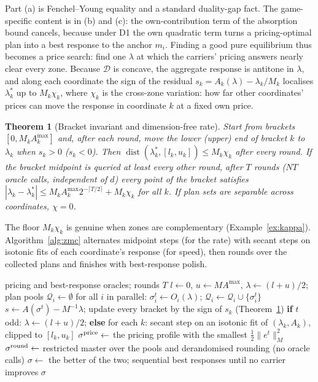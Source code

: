 \documentclass[preprint,12pt]{elsarticle}
\newtheorem{theorem}{Theorem}
\theoremstyle{definition}
\theoremstyle{remark}
\newcommand{\Amax}{A^{\max}}
\begin{document}
Part (a) is Fenchel--Young equality and a standard duality-gap fact. The game-specific content is in (b) and (c): the own-contribution term of the absorption bound cancels, because under D1 the own quadratic term turns a pricing-optimal plan into a best response to the anchor $m_i$. Finding a good pure equilibrium thus becomes a price search: find one $\lambda$ at which the carriers' pricing answers nearly clear every zone. Because $\mathcal D$ is concave, the aggregate response is antitone in $\lambda$, and along each coordinate the sign of the residual $s_k=A_k(\lambda)-\lambda_k/M_k$ localises $\lambda^*_k$ up to $M_k\chi_k$, where $\chi_k$ is the cross-zone variation: how far other coordinates' prices can move the response in coordinate $k$ at a fixed own price.

\begin{theorem}[Bracket invariant and dimension-free rate]\label{thm:bracket}
Start from brackets $[0,M_k\Amax_k]$ and, after each round, move the lower (upper) end of bracket $k$ to $\lambda_k$ when $s_k>0$ ($s_k<0$). Then $\operatorname{dist}(\lambda^*_k,[l_k,u_k])\le M_k\chi_k$ after every round. If the bracket midpoint is queried at least every other round, after $T$ rounds ($NT$ oracle calls, independent of $d$) every point of the bracket satisfies $|\lambda_k-\lambda^*_k|\le M_k\Amax_k2^{-\lceil T/2\rceil}+M_k\chi_k$ for all $k$. If plan sets are separable across coordinates, $\chi=0$.
\end{theorem}

The floor $M_k\chi_k$ is genuine when zones are complementary (Example~\ref{ex:kappa}). Algorithm~\ref{alg:zmc} alternates midpoint steps (for the rate) with secant steps on isotonic fits of each coordinate's response (for speed), then rounds over the collected plans and finishes with best-response polish.

\begin{algorithm}[t]
\caption{ZMC: zone-market clearing for pure equilibria of the D1 game}\label{alg:zmc}
\begin{algorithmic}[1]
\Require pricing and best-response oracles; rounds $T$
\State $l\gets0$, $u\gets M\Amax$, $\lambda\gets(l+u)/2$; plan pools $\mathcal Q_i\gets\emptyset$
 \State for all $i$ in parallel: $\sigma^t_i\gets O_i(\lambda)$; $\mathcal Q_i\gets\mathcal Q_i\cup\{\sigma^t_i\}$ 
 \State $s\gets A(\sigma^t)-M^{-1}\lambda$; update every bracket by the sign of $s_k$ (Theorem~\ref{thm:bracket})
 \State \textbf{if} $t$ odd: $\lambda\gets(l+u)/2$; \textbf{else} for each $k$: secant step on an isotonic fit of $(\lambda_k,A_k)$, clipped to $[l_k,u_k]$
\EndFor
\State $\sigma^{\rm price}\gets$ the pricing profile with the smallest $\tfrac12\|e^t\|_M^2$
\State $\sigma^{\rm round}\gets$ restricted master over the pools and derandomised rounding (no oracle calls)
\State $\sigma\gets$ the better of the two; sequential best responses until no carrier improves
\State \Return $\sigma$
\end{algorithmic}
\end{algorithm}
\end{document}
